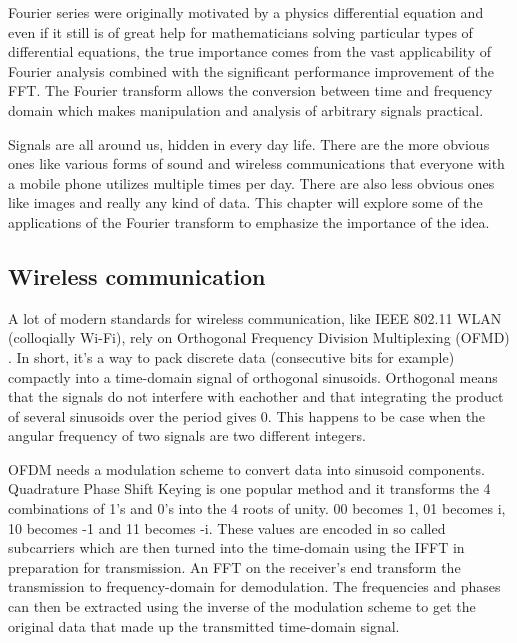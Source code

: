 Fourier series were originally motivated by a physics differential equation and even if it still is of great help for mathematicians solving particular types of differential equations, the true importance comes from the vast applicability of Fourier analysis combined with the significant performance improvement of the FFT. The Fourier transform allows the conversion between time and frequency domain which makes manipulation and analysis of arbitrary signals practical. 

Signals are all around us, hidden in every day life. There are the more obvious ones like various forms of sound and wireless communications that everyone with a mobile phone utilizes multiple times per day. There are also less obvious ones like images and really any kind of data. This chapter will explore some of the applications of the Fourier transform to emphasize the importance of the idea. 

\subsection{Wireless communication}
A lot of modern standards for wireless communication, like IEEE 802.11 WLAN (colloqially Wi-Fi), rely on Orthogonal Frequency Division Multiplexing (OFMD) . In short, it's a way to pack discrete data (consecutive bits for example) compactly into a time-domain signal of orthogonal sinusoids. Orthogonal means that the signals do not interfere with eachother and that integrating the product of several sinusoids over the period gives 0. This happens to be case when the angular frequency of two signals are two different integers. 

OFDM needs a modulation scheme to convert data into sinusoid components. Quadrature Phase Shift Keying is one popular method and it transforms the 4 combinations of 1's and 0's into the 4 roots of unity. 00 becomes 1, 01 becomes i, 10 becomes -1 and 11 becomes -i. These values are encoded in so called subcarriers which are then turned into the time-domain using the IFFT in preparation for transmission. An FFT on the receiver's end transform the transmission to frequency-domain for demodulation. The frequencies and phases can then be extracted using the inverse of the modulation scheme to get the original data that made up the transmitted time-domain signal.

